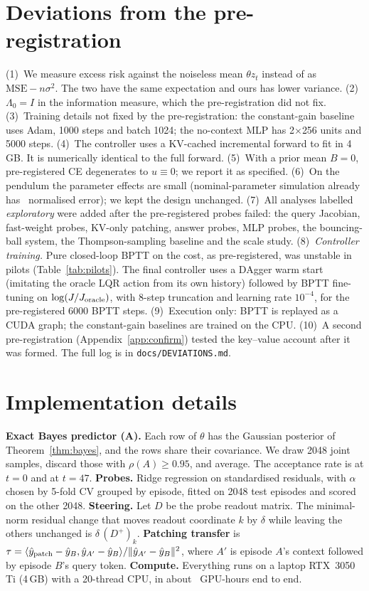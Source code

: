 \section{Deviations from the pre-registration}\label{app:dev}
(1)~We measure excess risk against the noiseless mean $\theta z_t$ instead of as $\mathrm{MSE}-n\sigma^2$. The two have the same
expectation and ours has lower variance. (2)~$\Lambda_0{=}I$ in the information measure, which the pre-registration did not fix.
(3)~Training details not fixed by the pre-registration: the constant-gain baseline uses Adam, 1000 steps and batch 1024; the no-context MLP has
2$\times$256 units and 5000 steps. (4)~The controller uses a KV-cached incremental forward to fit in 4\,GB. It is
numerically identical to the full forward. (5)~With a prior mean $B{=}0$, pre-registered CE degenerates to $u\equiv0$;
we report it as specified. (6)~On the pendulum the parameter effects are small (nominal-parameter simulation already
has \BPNom\ normalised error); we kept the design unchanged.
(7)~All analyses labelled \emph{exploratory} were added after the pre-registered probes failed: the query Jacobian,
fast-weight probes, KV-only patching, answer probes, MLP probes, the bouncing-ball system, the Thompson-sampling
baseline and the scale study. (8)~\emph{Controller training.} Pure closed-loop BPTT on the cost, as pre-registered, was
unstable in pilots (Table~\ref{tab:pilots}). The final controller uses a DAgger warm start (imitating the oracle LQR
action from its own history) followed by BPTT fine-tuning on $\log(J/J_{\rm oracle})$, with 8-step truncation and
learning rate $10^{-4}$, for the pre-registered 6000 BPTT steps. (9)~Execution only: BPTT is replayed as a CUDA graph; the
constant-gain baselines are trained on the CPU. (10)~A second pre-registration (Appendix~\ref{app:confirm}) tested the
key--value account after it was formed. The full log is in \texttt{docs/DEVIATIONS.md}.

\section{Implementation details}\label{app:impl}
\textbf{Exact Bayes predictor (A).} Each row of $\theta$ has the Gaussian posterior of Theorem~\ref{thm:bayes}, and
the rows share their covariance. We draw 2048 joint samples, discard those with $\rho(A)\ge0.95$, and average. The
acceptance rate is \AaccZero{} at $t{=}0$ and \AaccLast{} at $t{=}47$.
\textbf{Probes.} Ridge regression on standardised residuals, with $\alpha$ chosen by 5-fold CV grouped by episode,
fitted on 2048 test episodes and scored on the other 2048. \textbf{Steering.} Let $D$ be the probe readout matrix. The
minimal-norm residual change that moves readout coordinate $k$ by $\delta$ while leaving the others unchanged is
$\delta\,(D^+)_k$. \textbf{Patching transfer} is
$\tau=\langle\hat y_{\rm patch}-\hat y_B,\hat y_{A'}-\hat y_B\rangle/\|\hat y_{A'}-\hat y_B\|^2$, where $A'$ is
episode $A$'s context followed by episode $B$'s query token. \textbf{Compute.} Everything runs on a laptop RTX~3050\,Ti
(4\,GB) with a 20-thread CPU, in about \Hours\ GPU-hours end to end.

